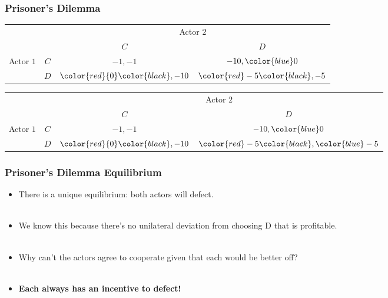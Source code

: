 \documentclass[handout]{beamer}
\begin{document}
 \begin{frame} 
 \frametitle{\LARGE{Prisoner's Dilemma}}
 \begin{table}
 	\LARGE
 	\begin{tabular}{cc|c|c|}
 		& \multicolumn{1}{c}{} & \multicolumn{2}{c}{Actor $2$}\\
 		& \multicolumn{1}{c}{} & \multicolumn{1}{c}{$C$}  & \multicolumn{1}{c}{$D$} \\\cline{3-4}
 	{Actor $1$}  & $C$ & $-1,-1$ & $-10,\color{blue}0$ \\\cline{3-4}
 		& $D$ & $\color{red}{0}\color{black},-10$ & $\color{red}-5\color{black},-5$ \\\cline{3-4}
 	\end{tabular}
 \end{table}
 \end{frame}

 \begin{frame}
 \begin{table}
 	\LARGE
 	\begin{tabular}{cc|c|c|}
 		& \multicolumn{1}{c}{} & \multicolumn{2}{c}{Actor $2$}\\
 		& \multicolumn{1}{c}{} & \multicolumn{1}{c}{$C$}  & \multicolumn{1}{c}{$D$} \\\cline{3-4}
 	{Actor $1$}  & $C$ & $-1,-1$ & $-10,\color{blue}0$ \\\cline{3-4}
 		& $D$ & $\color{red}{0}\color{black},-10$ & $\color{red}-5\color{black},\color{blue}-5$ \\\cline{3-4}
 	\end{tabular}
 \end{table}
 \end{frame}

 \begin{frame} 
 \frametitle{\LARGE{Prisoner's Dilemma Equilibrium}}
 	\begin{itemize}
 		\item There is a unique equilibrium: both actors will defect. \pause \\~\\
 		\item We know this because there's no unilateral deviation from choosing D that is profitable. \pause \\~\\
 		\item Why can't the actors agree to cooperate given that each would be better off? \pause \\~\\
 		\item \textbf{Each always has an incentive to defect!}
 	\end{itemize}
 \end{frame}
\end{document}
